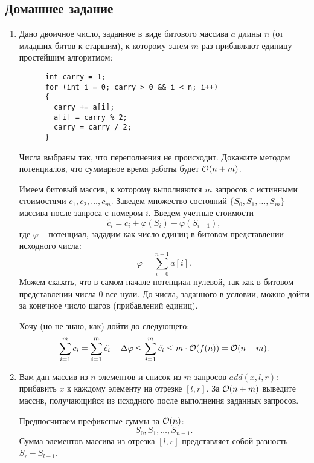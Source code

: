\subsection{Домашнее задание}
\begin{enumerate}

  \item
    Дано двоичное число, заданное в виде битового массива $a$ длины $n$ (от младших битов к старшим), к которому
    затем $m$ раз прибавляют единицу простейшим алгоритмом:
    \begin{lstlisting}
      int carry = 1;
      for (int i = 0; carry > 0 && i < n; i++)
      {
        carry += a[i];
        a[i] = carry % 2;
        carry = carry / 2;
      }
    \end{lstlisting}
    Числа выбраны так, что переполнения не происходит. Докажите методом потенциалов, что суммарное время
    работы будет $\mathcal{O}(n + m)$.
    \begin{solution}
      Имеем битовый массив, к которому выполняются $m$ запросов с истинными стоимостями $c_1, c_2, \ldots, c_m$. Заведем множество состояний $\{S_0, S_1, \ldots, S_m\}$ массива после запроса с номером $i$. Введем учетные стоимости
      \begin{equation}
        \tilde{c_i} = c_i + \varphi(S_i) - \varphi(S_{i-1}),
      \end{equation}
      где $\varphi$ -- потенциал, зададим как число единиц в битовом представлении исходного числа:
      \begin{equation}
        \varphi = \sum_{i = 0}^{n - 1} a[i].
      \end{equation}
      Можем сказать, что в самом начале потенциал нулевой, так как в битовом представлении числа 0 все нули. До числа, заданного в условии, можно дойти за конечное число шагов (прибавлений единиц).

      Хочу (но не знаю, как) дойти до следующего:
      \begin{equation}
        \sum_{i = 1}^{m} c_i = \sum_{i = 1}^{m} \tilde{c_i} - \Delta \varphi \leq \sum_{i = 1}^{m} \tilde{c_i} \leq m \cdot \mathcal{O}(f(n)) = \mathcal{O}(n + m).
      \end{equation}
    \end{solution}

  \item
    Вам дан массив из $n$ элементов и
    список из $m$ запросов $add(x, l, r)$: прибавить $x$ к каждому
    элементу на отрезке $[l, r]$. За $\mathcal{O}(n + m)$ выведите массив,
    получающийся из исходного после выполнения заданных запросов.
    \begin{solution}
      Предпосчитаем префиксные суммы за $\mathcal{O}(n)$:
      \begin{equation}
        S_0, S_1, \ldots, S_{n-1}.
      \end{equation}
      Сумма элементов массива из отрезка $[l, r]$ представляет собой разность $S_r - S_{l - 1}$.
    \end{solution}


\end{enumerate}
